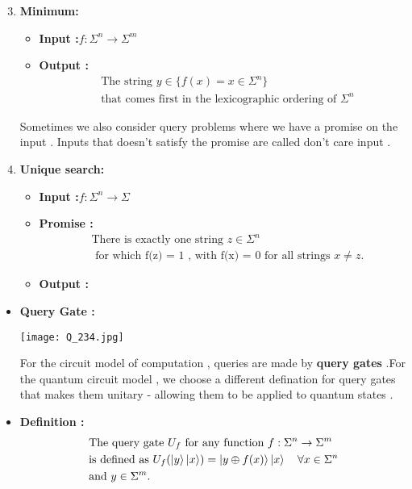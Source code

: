 \documentclass[12pt]{beamer}
\begin{document}
\begin{frame}[allowframebreaks]
 \begin{enumerate}
\setcounter{enumi}{2}
\item\textbf{Minimum:}
\begin{itemize}
\item\textbf{Input :}$f: \Sigma^n \rightarrow \Sigma^m$
\item\textbf{Output :}
\[
      \begin{split}
        &\text{The string } y \in \{ f(x) = x \in \Sigma^n \} \\
        &\text{that comes first in the lexicographic ordering of } \Sigma^n
      \end{split}
      \]
\end{itemize}
Sometimes we also consider query problems where we have a promise on the input . Inputs that doesn't satisfy the promise are called don't care input .
\item\textbf{Unique search:}
\begin{itemize}
\item\textbf{Input :}$f: \Sigma^n \rightarrow \Sigma$
\item\textbf{Promise :}
\[
\begin{split}
	&\text{There is exactly one string }z \in \Sigma^n \\
 	&\text{ for which f(z) = 1 , with f(x) = 0 for all strings } x \neq z .
 \end{split}
\]
\item\textbf{Output :}
\end{itemize}
\end{enumerate}
\end{frame}
\begin{frame}
\begin{itemize}
\item\textbf{Query Gate :}
 \begin{center}
        \texttt{[image: Q\_234.jpg]}
    \end{center}
For the circuit model of computation , queries are made by \textbf{query gates} .For the quantum circuit model , we choose a different defination for query gates that makes them unitary - allowing them to be applied to quantum states .
\item\textbf{Definition :}
\[
	\begin{aligned}
         &\text{The query gate } U_f \text{ for any function } f : \Sigma^n \rightarrow \Sigma^m \\
	 &\text{is defined as } U_f(\ket{y} \ket{x}) = \ket{y \oplus f(x)} \ket{x} \quad \forall x\in \Sigma^n \\
	 &\text{and }y \in \Sigma^m. 
	\end{aligned}
\]
\end{itemize}
\end{frame}
\end{document}
